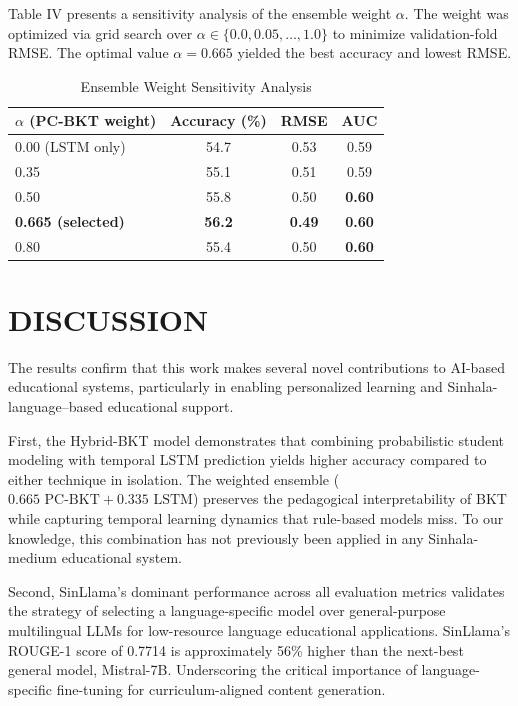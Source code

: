 \documentclass[conference]{IEEEtran}
\begin{document}
Table IV presents a sensitivity analysis of the ensemble weight $\alpha$. The weight was optimized via grid search over $\alpha \in \{0.0, 0.05, \dots, 1.0\}$ to minimize validation-fold RMSE. The optimal value $\alpha = 0.665$ yielded the best accuracy and lowest RMSE.

\begin{table}[htbp]
\caption{Ensemble Weight Sensitivity Analysis}
\label{tab4}
\vspace{-1.5em}
\begin{center}
\begin{tabular}{lccc}
\toprule
\textbf{$\alpha$ (PC-BKT weight)} & \textbf{Accuracy (\%)} & \textbf{RMSE} & \textbf{AUC} \\
\midrule
0.00 (LSTM only) & 54.7 & 0.53 & 0.59 \\
0.35 & 55.1 & 0.51 & 0.59 \\
0.50 & 55.8 & 0.50 & \textbf{0.60} \\
\textbf{0.665 (selected)} & \textbf{56.2} & \textbf{0.49} & \textbf{0.60} \\
0.80 & 55.4 & 0.50 & \textbf{0.60} \\
\bottomrule
\end{tabular}
\end{center}
\vspace{-1.0em}
\end{table}

\section{DISCUSSION}
The results confirm that this work makes several novel contributions to AI-based educational systems, particularly in enabling personalized learning and Sinhala-language–based educational support.

First, the Hybrid-BKT model demonstrates that combining probabilistic student modeling with temporal LSTM prediction yields higher accuracy compared to either technique in isolation. The weighted ensemble ($0.665 \text{ PC-BKT} + 0.335 \text{ LSTM}$) preserves the pedagogical interpretability of BKT while capturing temporal learning dynamics that rule-based models miss. To our knowledge, this combination has not previously been applied in any Sinhala-medium educational system.

Second, SinLlama's dominant performance across all evaluation metrics validates the strategy of selecting a language-specific model over general-purpose multilingual LLMs for low-resource language educational applications. SinLlama's ROUGE-1 score of 0.7714 is approximately 56\% higher than the next-best general model, Mistral-7B. Underscoring the critical importance of language-specific fine-tuning for curriculum-aligned content generation.
\end{document}
